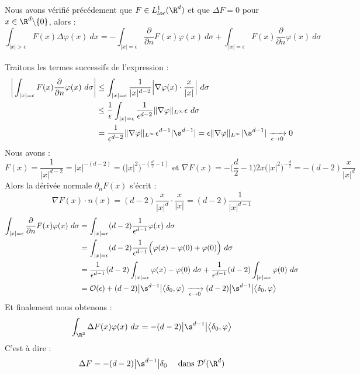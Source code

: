 Nous avons vérifié précédement que $F \in L^1_{loc}(\R^d)$ et que $\Delta F = 0$ pour $x \in \R^d\backslash \{0\}$, alors :
$$\int_{|x|>\epsilon} F(x) \Delta \varphi(x) \ dx = - \int_{|x|=\epsilon} \frac{\partial}{\partial n}F(x) \varphi(x) \ d\sigma + \int_{|x|=\epsilon} F(x) \frac{\partial}{\partial n}\varphi(x) \ d\sigma $$
\\
Traitons les termes successifs de l'expression :
\begin{align*}
    \bigg|\int_{|x|=\epsilon} F(x) \frac{\partial}{\partial n}\varphi(x) \ d\sigma \bigg| &\leq \int_{|x|=\epsilon} \frac{1}{|x|^{d-2}} \Big|\nabla \varphi(x) \cdot \frac{x}{|x|} \Big| \ d\sigma \\
    &\leq \frac{1}{\epsilon} \int_{|x|=\epsilon} \frac{1}{\epsilon^{d-2}} \|\nabla \varphi\|_{L^{\infty}} \epsilon \ d\sigma \\
    &= \frac{1}{\epsilon^{d-2}}\|\nabla \varphi\|_{L^{\infty}} \epsilon^{d-1} |\s^{d-1}| = \epsilon \| \nabla \varphi \|_{L^{\infty}} |\s^{d-1}| \xrightarrow[\epsilon \to 0]{} 0
\end{align*}
Nous avons :
$$F(x) = \frac{1}{|x|^{d-2}} = |x|^{-(d-2)} = \big(|x|^2\big)^{-(\frac{d}{2} - 1)} \text{ et } \nabla F(x) = -\big(\frac{d}{2}-1\big)2x\big(|x|^2\big)^{-\frac{d}{2}} = -(d - 2) \frac{x}{|x|^d}$$
Alors la dérivée normale $\partial_n F(x)$ s'écrit : 
$$\nabla F(x) \cdot n(x) = (d - 2) \frac{x}{|x|^d} \cdot \frac{x}{|x|} = (d-2) \frac{1}{|x|^{d-1}} $$
\begin{align*}
    \int_{|x|=\epsilon} \frac{\partial}{\partial n}F(x) \varphi(x) \ d\sigma &= \int_{|x|=\epsilon} (d-2)\frac{1}{\epsilon^{d-1}}\varphi(x) \ d\sigma \\
    &= \int_{|x|=\epsilon} (d-2)\frac{1}{\epsilon^{d-1}} \Big( \varphi(x) - \varphi(0) + \varphi(0) \Big) \ d\sigma \\
    &= \frac{1}{\epsilon^{d-1}} (d-2) \int_{|x|=\epsilon} \varphi(x) - \varphi(0) \ d\sigma + \frac{1}{\epsilon^{d-1}} (d-2) \int_{|x|=\epsilon} \varphi(0) \ d\sigma \\
    &= \mathcal{O}(\epsilon) + (d-2)\big|\s^{d-1}\big| \big< \delta_0, \varphi \big> \xrightarrow[\epsilon \to 0]{} (d-2)\big|\s^{d-1}\big|\big< \delta_0, \varphi \big>
\end{align*}
Et finalement nous obtenons :
$$\int_{\R^3} \Delta F(x) \varphi(x) \ dx = -(d-2)\big| \s^{d-1} \big| \big< \delta_0,\varphi \big> $$
C'est à dire :
$$\Delta F = -(d-2) \big| \s^{d-1} \big| \delta_0 \quad \text{ dans } \mathcal{D}'(\R^d) $$
\\
\\
